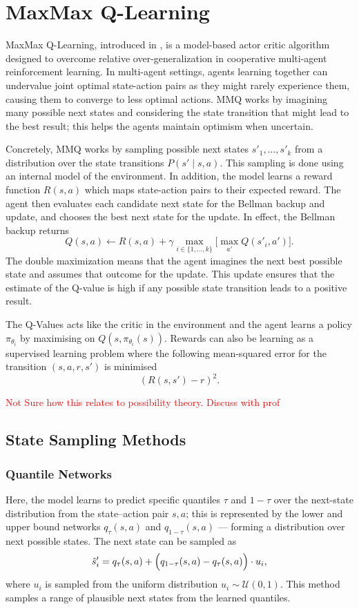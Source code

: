 \documentclass[12pt,a4paper]{report}
\newcommand\myworries[1]{\textcolor{red}{#1}}
\begin{document}
\chapter{MaxMax Q-Learning}

MaxMax Q-Learning, introduced in \cite{zhu2024maxmax}, is a model-based actor critic algorithm designed to overcome relative over-generalization in cooperative multi-agent reinforcement learning. In multi-agent settings, agents learning together can undervalue joint optimal state-action pairs as they might rarely experience them, causing them to converge to less optimal actions. MMQ works by imagining many possible next states and considering the state transition that might lead to the best result; this helps the agents maintain optimism when uncertain. \par 

Concretely, MMQ works by sampling possible next states $s'_1, \dots, s'_k$ from a distribution over the state transitions $P(s'\mid s,a)$. This sampling is done using an internal model of the environment. In addition, the model learns a reward function $R(s,a)$ which maps state-action pairs to their expected reward. The agent then evaluates each candidate next state for the Bellman backup and update, and chooses the best next state for the update. In effect, the Bellman backup returns
\[
  Q(s,a) \leftarrow R(s,a) + \gamma \max_{i \in \{1, \dots, k\}} \Big[\max_{a'} Q(s'_i, a')\Big].
\]
The double maximization means that the agent imagines the next best possible state and assumes that outcome for the update. This update ensures that the estimate of the Q-value is high if any possible state transition leads to a positive result.\par

The Q-Values acts like the critic in the environment and the agent learns a policy $\pi_{\theta_i}$ by maximising on $Q(s, \pi_{\theta_i}(s))$. Rewards can also be learning as a supervised learning problem where the following mean-squared error for the transition $(s,a,r, s')$ is minimised 
\[
  (R(s,s') - r)^2.
\]

\myworries{Not Sure how this relates to possibility theory. Discuss with prof}

\section{State Sampling Methods}
\subsection{Quantile Networks}
Here, the model learns to predict specific quantiles \(\tau\) and \(1-\tau\) over the next-state distribution from the state--action pair \(s,a\); this is represented by the lower and upper bound networks \(q_\tau(s,a)\) and \(q_{1-\tau}(s,a)\) — forming a distribution over next possible states. The next state can be sampled as
\[
  \hat{s}'_i = q_\tau(s,a) + \Bigl(q_{1-\tau}(s,a) - q_\tau(s,a)\Bigr) \cdot u_i,
\]
where \(u_i\) is sampled from the uniform distribution \(u_i \sim \mathcal{U}(0,1)\). This method samples a range of plausible next states from the learned quantiles. \par
\end{document}
